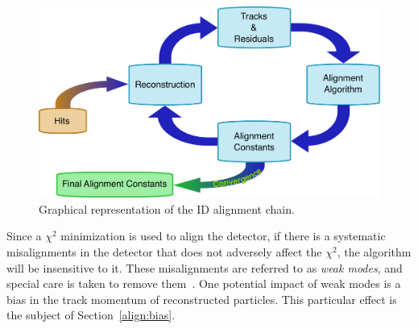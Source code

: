 \begin{figure}[htbp]
  \centering
  \includegraphics[width=.8\textwidth]{figs/alignment/alignment-chain}
  \caption{Graphical representation of the ID alignment chain.}
  \label{fig:alignment_chain}
\end{figure}

Since a $\chi^2$ minimization is used to align the detector, if there is a systematic misalignments in the detector that does not adversely affect the $\chi^2$, the algorithm will be insensitive to it.
These misalignments are referred to as \emph{weak modes}, and special care is taken to remove them~\cite{2014.alignment-performance-8tev}.
One potential impact of weak modes is a bias in the track momentum of reconstructed particles.
This particular effect is the subject of Section~\ref{align:bias}.

